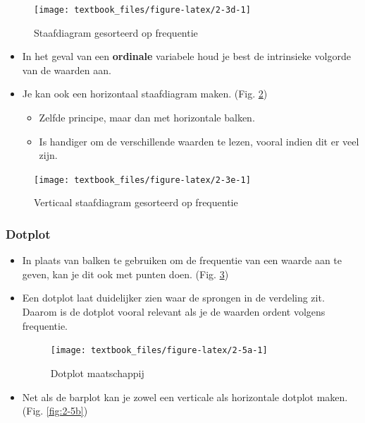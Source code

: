 \documentclass[]{tufte-book}
\providecommand{\tightlist}{%
  \setlength{\itemsep}{0pt}\setlength{\parskip}{0pt}}
\begin{document}
\begin{figure}
\texttt{[image: textbook\_files/figure-latex/2-3d-1]} \caption[Staafdiagram gesorteerd op frequentie]{Staafdiagram gesorteerd op frequentie}\label{fig:2-3d}
\end{figure}

\begin{itemize}
\item
  In het geval van een \textbf{ordinale} variabele houd je best de intrinsieke volgorde van de waarden aan.
\item
  Je kan ook een horizontaal staafdiagram maken. (Fig. \ref{fig:2-3e})

  \begin{itemize}
  \tightlist
  \item
    Zelfde principe, maar dan met horizontale balken.
  \item
    Is handiger om de verschillende waarden te lezen, vooral indien dit er veel zijn.
  \end{itemize}
\end{itemize}

\begin{figure}
\texttt{[image: textbook\_files/figure-latex/2-3e-1]} \caption[Verticaal staafdiagram gesorteerd op frequentie]{Verticaal staafdiagram gesorteerd op frequentie}\label{fig:2-3e}
\end{figure}

\hypertarget{dotplot}{%
\subsubsection{Dotplot}\label{dotplot}}

\begin{itemize}
\item
  In plaats van balken te gebruiken om de frequentie van een waarde aan te geven, kan je dit ook met punten doen. (Fig. \ref{fig:2-5a})
\item
  Een dotplot laat duidelijker zien waar de sprongen in de verdeling zit. Daarom is de dotplot vooral relevant als je de waarden ordent volgens frequentie.

  \begin{figure}
  \texttt{[image: textbook\_files/figure-latex/2-5a-1]} \caption[Dotplot maatschappij]{Dotplot maatschappij}\label{fig:2-5a}
  \end{figure}
\item
  Net als de barplot kan je zowel een verticale als horizontale dotplot maken. (Fig. \ref{fig:2-5b})
\end{itemize}
\end{document}
